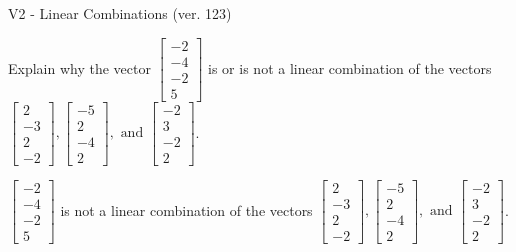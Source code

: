\begin{exercise}
  \begin{exerciseTitle}V2 - Linear Combinations (ver. 123)\end{exerciseTitle}
  \begin{exerciseStatement}
    Explain why the vector \(\left[\begin{array}{c}
-2 \\
-4 \\
-2 \\
5
\end{array}\right]\)  is or is not a linear 
	combination of the vectors \(\left[\begin{array}{c}
2 \\
-3 \\
2 \\
-2
\end{array}\right] , \left[\begin{array}{c}
-5 \\
2 \\
-4 \\
2
\end{array}\right] , \text{ and } \left[\begin{array}{c}
-2 \\
3 \\
-2 \\
2
\end{array}\right]\).
	


  \end{exerciseStatement}
  \begin{exerciseAnswer}
   \(\left[\begin{array}{c}
-2 \\
-4 \\
-2 \\
5
\end{array}\right]\) 
  	 is not  
	a linear combination of the vectors \(\left[\begin{array}{c}
2 \\
-3 \\
2 \\
-2
\end{array}\right] , \left[\begin{array}{c}
-5 \\
2 \\
-4 \\
2
\end{array}\right] , \text{ and } \left[\begin{array}{c}
-2 \\
3 \\
-2 \\
2
\end{array}\right]\).

	
  


  \end{exerciseAnswer}
\end{exercise}